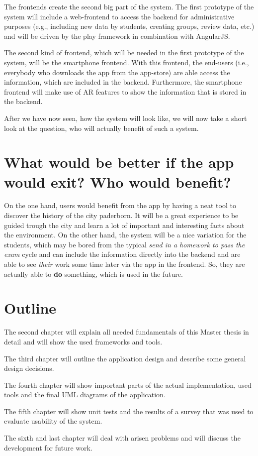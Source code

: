The frontends create the second big part of the system. The first prototype of the system will include a web-frontend to access the backend for administrative purposes (e.g., including new data by students, creating groups, review data, etc.) and will be driven by the play framework in combination with AngularJS. 

The second kind of frontend, which will be needed in the first prototype of the system, will be the smartphone frontend. With this frontend, the end-users (i.e., everybody who downloads the app from the app-store) are able access the information, which are included in the backend. Furthermore, the smartphone frontend will make use of \ac{AR} features to show the information that is stored in the backend. 

After we have now seen, how the system will look like, we will now take a short look at the question, who will actually benefit of such a system.   

\section{What would be better if the app would exit? Who would benefit?}
On the one hand, users would benefit from the app by having a neat tool to discover the history of the city paderborn. It will be a great experience to be guided trough the city and learn a lot of important and interesting facts about the environment. 
On the other hand, the system will be a nice variation for the students, which may be bored from the typical \textit{send in a homework to pass the exam} cycle and can include the information directly into the backend and are able to see \textit{their} work some time later via the app in the frontend. So, they are actually able to \textbf{do} something, which is used in the future.    

\section{Outline}
The second chapter will explain all needed fundamentals of this Master thesis in detail and will show the used frameworks and tools.

The third chapter will outline the application design and describe some general design decisions.

The fourth chapter will show important parts of the actual implementation, used tools and the final \acf{UML} diagrams of the application.

The fifth chapter will show unit tests and the results of a survey that was used to evaluate usability of the system. 

The sixth and last chapter will deal with arisen problems and will discuss the development for future work.
